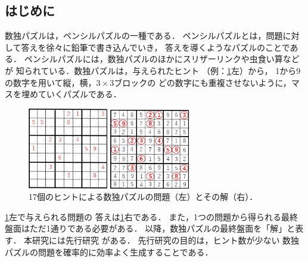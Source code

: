 \documentclass[a4paper, 9pt]{jarticle}
\begin{document}
\small

\twocolumn[\vspace*{29mm}] %
\begin{論文概要}           %

\section{はじめに}
数独パズルは，ペンシルパズルの一種である．
ペンシルパズルとは，問題に対して答えを徐々に鉛筆で書き込んでいき，
答えを導くようなパズルのことである．
ペンシルパズルには，数独パズルのほかにスリザーリンクや虫食い算などが
知られている．数独パズルは，与えられたヒント
（例：\figurename{\ref{fig:problem_and_answer}}左）から，
1から9の数字を用いて縦，横，$3 \times 3$ブロックの
どの数字にも重複させないように，マスを埋めていくパズルである．
\begin{figure}[b]
  \begin{minipage}[b]{0.49\linewidth}
    \centering
    \includegraphics[width=3.5cm]{prob.png}
  \end{minipage}
  \begin{minipage}[b]{0.49\linewidth}
    \centering
    \includegraphics[width=3.5cm]{ans.png}
  \end{minipage}
  \caption{17個のヒントによる数独パズルの問題（左）とその解（右）．}
  \label{fig:problem_and_answer}
\end{figure}
\figurename{\ref{fig:problem_and_answer}}左で与えられる問題の
答えは\figurename{\ref{fig:problem_and_answer}}右である．
また，1つの問題から得られる最終盤面はただ1通りである必要がある．
以降，数独パズルの最終盤面を「解」と表す．
本研究には先行研究 \cite{previous_research} がある．
先行研究の目的は，ヒント数が少ない
数独パズルの問題を確率的に効率よく生成することである．

\end{論文概要}
\end{document}
